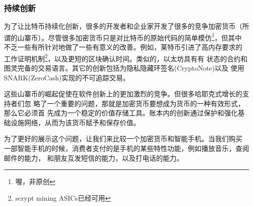 \documentclass[letterpaper]{article}
\begin{document}
\subsubsection{持续创新}
为了让比特币持续化创新，很多的开发者和企业家开发了很多的竞争加密货币（所
  谓的山寨币）。尽管很多加密货币只是对比特币的原始代码的简单模仿\footnote{喔，非原创}，但其中
不乏一些有所针对地做了一些有意义的改善。例如，莱特币引进了高内存要求的
工作证明机制\footnote{scrypt mining ASICs已经可用}，以及更短的区块确认时间。类似的，以太坊具有有
状态的合约和图灵完备的交易语言\cite{Ethereum}。其它的创新包括为隐私隐藏环签名(CryptoNote)\cite{CryptoNote}以及
使用SNARK(ZeroCash)\cite{Zerocash}实现的不可追踪交易。

这些山寨币的崛起促使在软件创新上的更加激烈的竞争。但很多哈耶克式增长的支持者们忽
略了一个重要的问题，那就是加密货币要想成为货币的一种有效形式，那么它必须首
先成为一个稳定的价值存储工具。账本内的创新通过保护和强化基础设施网络，从而为该货币赋予和保存价值。


为了更好的展示这个问题，让我们来比较一个加密货币和智能手机。当我们购买
一部智能手机的时候，消费者支付的是手机的某些特性功能，例如播放音乐，查阅邮件的能力，
和朋友互发短信的能力，以及打电话的能力。
\end{document}
